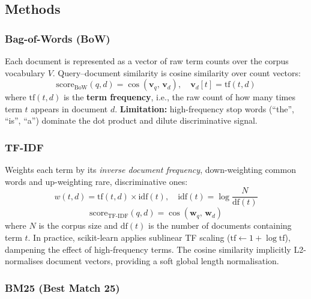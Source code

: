 \documentclass[12pt, a4paper]{article}
\begin{document}
\subsection{Methods}

\subsubsection*{Bag-of-Words (BoW)}

Each document is represented as a vector of raw term counts over the corpus
vocabulary $V$.  Query--document similarity is cosine similarity over count
vectors:
\begin{equation}
  \text{score}_{\text{BoW}}(q, d) = \cos(\mathbf{v}_q,\, \mathbf{v}_d),
  \quad \mathbf{v}_d[t] = \text{tf}(t, d)
  \label{eq:bow}
\end{equation}
where $\text{tf}(t, d)$ is the \textbf{term frequency}, i.e., the raw count of
how many times term $t$ appears in document $d$.
\textbf{Limitation:} high-frequency stop words (``the'', ``is'', ``a'')
dominate the dot product and dilute discriminative signal.

\subsubsection*{TF-IDF}

Weights each term by its \emph{inverse document frequency}, down-weighting
common words and up-weighting rare, discriminative ones:
\begin{equation}
  w(t, d) = \text{tf}(t, d) \times \text{idf}(t), \quad
  \text{idf}(t) = \log\!\frac{N}{\text{df}(t)}
  \label{eq:tfidf}
\end{equation}
\begin{equation}
  \text{score}_{\text{TF-IDF}}(q, d) = \cos(\mathbf{w}_q,\, \mathbf{w}_d)
  \label{eq:tfidf_score}
\end{equation}
where $N$ is the corpus size and $\text{df}(t)$ is the number of documents
containing term $t$.  In practice, scikit-learn applies sublinear TF scaling
($\text{tf} \leftarrow 1 + \log \text{tf}$), dampening the effect of
high-frequency terms.  The cosine similarity implicitly L2-normalises document
vectors, providing a soft global length normalisation.

\subsubsection*{BM25 (Best Match 25)}
\end{document}
